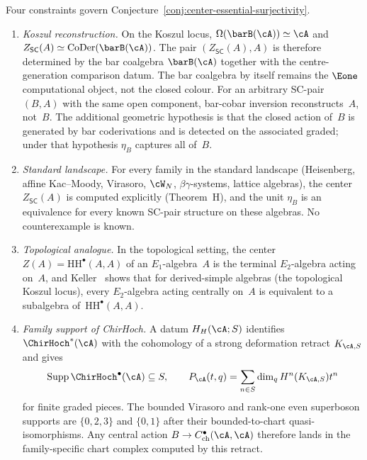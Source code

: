 \begin{remark}
\label{rem:center-surjectivity-constraints}
Four constraints govern
Conjecture~\ref{conj:center-essential-surjectivity}.
\begin{enumerate}[label=\textup{(\alph*)}]
\item \emph{Koszul reconstruction.}
On the Koszul locus, $\Omega(\barB(\cA)) \simeq \cA$ and
$Z_{\mathsf{SC}}(A) \simeq
\operatorname{CoDer}(\barB(\cA))$. The pair
$(Z_{\mathsf{SC}}(A), A)$ is therefore determined by the bar
coalgebra $\barB(\cA)$ together with the centre-generation comparison
datum. The bar coalgebra by itself remains the $\Eone$ computational
object, not the closed colour. For an arbitrary SC-pair
$(B,A)$ with the same open component, bar-cobar inversion
reconstructs~$A$, not~$B$. The additional geometric hypothesis is
 that the closed action of~$B$ is generated by bar coderivations and
 is detected on the associated graded; under that hypothesis
 $\eta_B$ captures all of~$B$.

\item \emph{Standard landscape.}
 For every family in the standard landscape (Heisenberg, affine
 Kac--Moody, Virasoro, $\cW_N$, $\beta\gamma$-systems, lattice
 algebras), the center $Z_{\mathsf{SC}}(A)$ is computed
 explicitly (Theorem~H), and the unit $\eta_B$ is an
 equivalence for every known SC-pair structure on these
 algebras. No counterexample is known.

\item \emph{Topological analogue.}
 In the topological setting, the center
 $Z(A) = \mathrm{HH}^\bullet(A, A)$ of an $E_1$-algebra~$A$ is
 the terminal $E_2$-algebra acting on~$A$, and
 Keller~\cite{Keller06} shows that for derived-simple algebras
 (the topological Koszul locus), every $E_2$-algebra acting
 centrally on~$A$ is equivalent to a subalgebra
 of~$\mathrm{HH}^\bullet(A, A)$.

\item \emph{Family support of ChirHoch.}
 A datum $H_H(\cA;S)$ identifies $\ChirHoch^*(\cA)$ with the
 cohomology of a strong deformation retract $K_{\cA,S}$ and gives
 \[
  \operatorname{Supp}\ChirHoch^\bullet(\cA)\subseteq S,
  \qquad
  P_\cA(t,q)=\sum_{n\in S}\dim_qH^n(K_{\cA,S})t^n
 \]
 for finite graded pieces.  The bounded Virasoro and rank-one even
 superboson supports are $\{0,2,3\}$ and $\{0,1\}$ after their
 bounded-to-chart quasi-isomorphisms.  Any central action
 $B\to C^\bullet_{\mathrm{ch}}(\cA,\cA)$ therefore lands in the
 family-specific chart complex computed by this retract.
\end{enumerate}
\end{remark}

